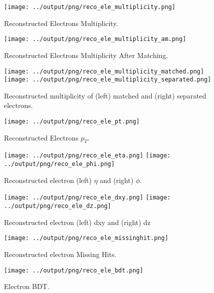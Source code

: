 \documentclass[11pt]{book}
\begin{document}
\begin{figure}[htb]
\centering
\texttt{[image: ../output/png/reco\_ele\_multiplicity.png]}
\caption{Reconstructed Electrons Multiplicity.}
\label{fig:reco_ele_multiplicity}
\end{figure}

\begin{figure}[htb]
\centering
\texttt{[image: ../output/png/reco\_ele\_multiplicity\_am.png]}
\caption{Reconstructed Electrons Multiplicity After Matching.}
\label{fig:reco_ele_multiplicity_am}
\end{figure}

\begin{figure}[htb]
\centering
\texttt{[image: ../output/png/reco\_ele\_multiplicity\_matched.png]}
\texttt{[image: ../output/png/reco\_ele\_multiplicity\_separated.png]}
\caption{Reconstructed multiplicity of (left) matched and (right) separated electrons.}
\label{fig:reco_ele_mat_sep}
\end{figure}

\begin{figure}[htb]
\centering
\texttt{[image: ../output/png/reco\_ele\_pt.png]}
\caption{Reconstructed Electrons $p_{T}$.}
\label{fig:reco_ele_pt}
\end{figure}

\begin{figure}[htb]
\centering
\texttt{[image: ../output/png/reco\_ele\_eta.png]}
\texttt{[image: ../output/png/reco\_ele\_phi.png]}
\caption{Reconstructed electron (left) $\eta$ and (right) $\phi$.}
\label{fig:reco_ele_eta_phi}
\end{figure}


\begin{figure}[htb]
\centering
\texttt{[image: ../output/png/reco\_ele\_dxy.png]}
\texttt{[image: ../output/png/reco\_ele\_dz.png]}
\caption{Reconstructed electron (left) dxy and (right) dz}
\label{fig:reco_ele_dxy_dz}
\end{figure}

\begin{figure}[htb]
\centering
\texttt{[image: ../output/png/reco\_ele\_missinghit.png]}
\caption{Reconstructed electron Missing Hits.}
\label{fig:reco_ele_missinghit}
\end{figure}

\begin{figure}[htb]
\centering
\texttt{[image: ../output/png/reco\_ele\_bdt.png]}
\caption{Electron BDT.}
\label{fig:reco_ele_bdt}
\end{figure}
\end{document}
